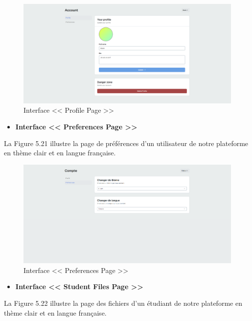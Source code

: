 \begin{figure}[H]
    \centering
    \includegraphics[width=1.1\textwidth,height=0.5\textwidth]{images/chp5/fig20.png}
    \caption{Interface << Profile Page >>}
    \label{Interface << Profile Page >>}    
\end{figure}
\begin{itemize}
    \item \textbf{Interface << Preferences Page >>}
\end{itemize}
La Figure 5.21 illustre la page de préférences d'un utilisateur de notre plateforme en thème clair et en langue française.
\begin{figure}[H]
    \centering
    \includegraphics[width=1.1\textwidth,height=0.5\textwidth]{images/chp5/fig21.png}
    \caption{Interface << Preferences Page >>}
    \label{Interface << Preferences Page >>}    
\end{figure}
\begin{itemize}
    \item \textbf{Interface << Student Files Page >>}
\end{itemize}
La Figure 5.22 illustre la page des fichiers d'un étudiant de notre plateforme en thème clair et en langue française.
